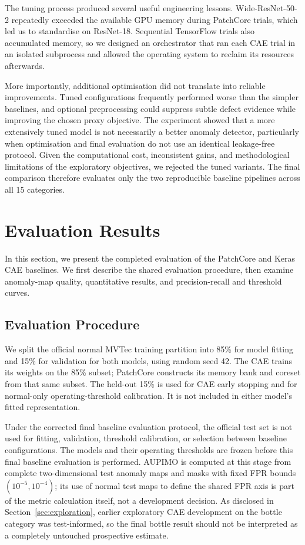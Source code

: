 \documentclass[11pt, a4paper]{article}
\begin{document}
The tuning process produced several useful engineering lessons. Wide-ResNet-50-2 repeatedly exceeded the available GPU memory during PatchCore trials, which led us to standardise on ResNet-18. Sequential TensorFlow trials also accumulated memory, so we designed an orchestrator that ran each CAE trial in an isolated subprocess and allowed the operating system to reclaim its resources afterwards.

More importantly, additional optimisation did not translate into reliable improvements. Tuned configurations frequently performed worse than the simpler baselines, and optional preprocessing could suppress subtle defect evidence while improving the chosen proxy objective. The experiment showed that a more extensively tuned model is not necessarily a better anomaly detector, particularly when optimisation and final evaluation do not use an identical leakage-free protocol. Given the computational cost, inconsistent gains, and methodological limitations of the exploratory objectives, we rejected the tuned variants. The final comparison therefore evaluates only the two reproducible baseline pipelines across all 15 categories.


\section{Evaluation Results}
\label{sec:evaluation}

In this section, we present the completed evaluation of the PatchCore and Keras CAE baselines. We first describe the shared evaluation procedure, then examine anomaly-map quality, quantitative results, and precision-recall and threshold curves.

\subsection{Evaluation Procedure}

We split the official normal MVTec training partition into 85\% for model fitting and 15\% for validation for both models, using random seed 42. The CAE trains its weights on the 85\% subset; PatchCore constructs its memory bank and coreset from that same subset. The held-out 15\% is used for CAE early stopping and for normal-only operating-threshold calibration. It is not included in either model's fitted representation.

Under the corrected final baseline evaluation protocol, the official test set is not used for fitting, validation, threshold calibration, or selection between baseline configurations. The models and their operating thresholds are frozen before this final baseline evaluation is performed. AUPIMO is computed at this stage from complete two-dimensional test anomaly maps and masks with fixed FPR bounds $(10^{-5},10^{-4})$; its use of normal test maps to define the shared FPR axis is part of the metric calculation itself, not a development decision. As disclosed in Section~\ref{sec:exploration}, earlier exploratory CAE development on the bottle category was test-informed, so the final bottle result should not be interpreted as a completely untouched prospective estimate.
\end{document}
